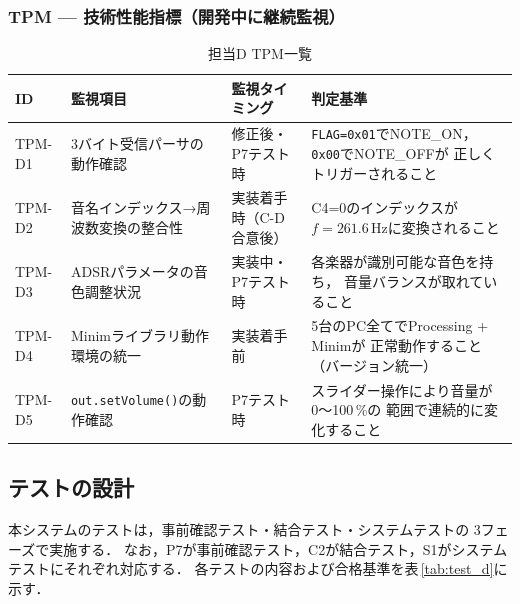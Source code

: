 \documentclass[lualatex,book,paper=a4paper,jafontsize=11.5pt,jafontscale=1.05,oneside]{jlreq}
\begin{document}
\subsubsection*{TPM — 技術性能指標（開発中に継続監視）}

\begin{table}[H]
  \centering
  \caption{担当D TPM一覧}
  \label{tab:tpm_d}
  \begin{tabular}{lp{4cm}p{3cm}p{4.5cm}}
    \hline
    ID & 監視項目 & 監視タイミング & 判定基準 \\
    \hline
    TPM-D1 & 3バイト受信パーサの動作確認
           & 修正後・P7テスト時
           & \texttt{FLAG=0x01}でNOTE\_ON，
             \texttt{0x00}でNOTE\_OFFが
             正しくトリガーされること \\
    TPM-D2 & 音名インデックス→周波数変換の整合性
           & 実装着手時（C-D合意後）
           & C4=0のインデックスが
             $f=261.6$\,Hzに変換されること \\
    TPM-D3 & ADSRパラメータの音色調整状況
           & 実装中・P7テスト時
           & 各楽器が識別可能な音色を持ち，
             音量バランスが取れていること \\
    TPM-D4 & Minimライブラリ動作環境の統一
           & 実装着手前
           & 5台のPC全てでProcessing + Minimが
             正常動作すること（バージョン統一） \\
    TPM-D5 & \texttt{out.setVolume()}の動作確認
           & P7テスト時
           & スライダー操作により音量が0〜100\,\%の
             範囲で連続的に変化すること \\
    \hline
  \end{tabular}
\end{table}

\subsection{テストの設計}

本システムのテストは，事前確認テスト・結合テスト・システムテストの
3フェーズで実施する．
なお，P7が事前確認テスト，C2が結合テスト，S1がシステムテストにそれぞれ対応する．
各テストの内容および合格基準を表\,\ref{tab:test_d}に示す．
\end{document}
